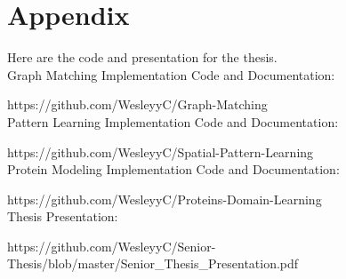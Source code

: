 \chapter*{Appendix}

Here are the code and presentation for the thesis.\\

Graph Matching Implementation Code and Documentation:

https://github.com/WesleyyC/Graph-Matching\\

Pattern Learning Implementation Code and Documentation:

https://github.com/WesleyyC/Spatial-Pattern-Learning\\

Protein Modeling Implementation Code and Documentation:

https://github.com/WesleyyC/Proteins-Domain-Learning\\

Thesis Presentation:

https://github.com/WesleyyC/Senior-Thesis/blob/master/Senior\_Thesis\_Presentation.pdf